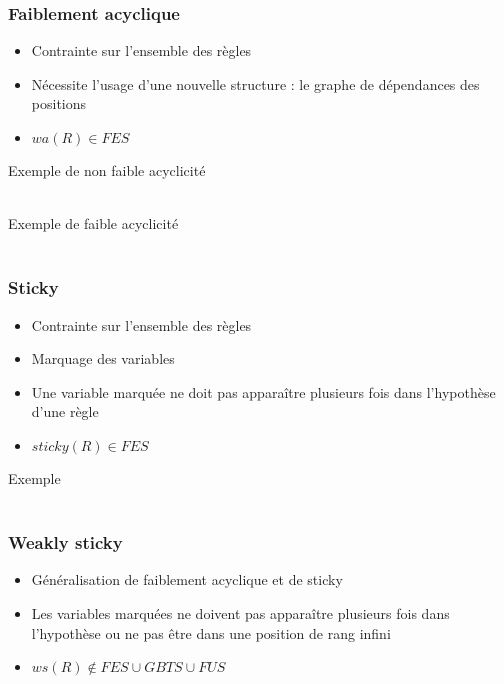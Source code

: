\begin{frame}
	\frametitle{Faiblement acyclique}
	\begin{itemize}
		\item Contrainte sur l'ensemble des règles
		\item Nécessite l'usage d'une nouvelle structure : le graphe de dépendances des
		positions
		\item $wa(R) \in FES$
	\end{itemize}
	\begin{exampleblock}{Exemple de non faible acyclicité}
		 \\
		 \\
	\end{exampleblock}
	\begin{exampleblock}{Exemple de faible acyclicité}
		 \\
		 \\
	\end{exampleblock}
\end{frame}

\begin{frame}
	\frametitle{Sticky}
	\begin{itemize}
		\item Contrainte sur l'ensemble des règles
		\item Marquage des variables
		\item Une variable marquée ne doit pas apparaître plusieurs fois dans l'hypothèse
		d'une règle
		\item $sticky(R) \in FES$
	\end{itemize}
	\begin{exampleblock}{Exemple}
		 \\
		 \\
	\end{exampleblock}
\end{frame}

\begin{frame}
	\frametitle{Weakly sticky}
	\begin{itemize}
		\item Généralisation de faiblement acyclique et de sticky
		\item Les variables marquées ne doivent pas apparaître plusieurs fois dans
		l'hypothèse ou ne pas être dans une position de rang infini
		\item $ws(R) \notin FES \cup GBTS \cup FUS$
	\end{itemize}
\end{frame}

